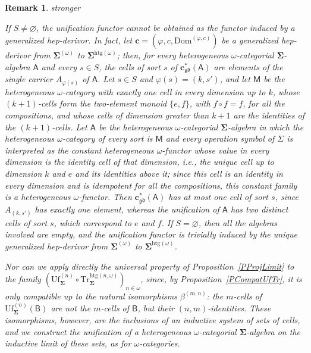 \documentclass[a4paper, reqno]{amsbook}
\makeatletter
\newcommand{\sig}[1]{\mathbf{#1}}             %
\newcommand{\calg}[1]{\boldsymbol{\mathsf{#1}}} %
\newcommand{\Dom}{\mathrm{Dom}}
\newcommand{\gd}{\mathfrak{gd}}              %
\newcommand{\htg}{\mathrm{htg}}                %
\newcommand{\Uf}{\mathrm{Uf}}
\newcommand{\Tr}{\mathrm{Tr}}
\theoremstyle{plain}
\newtheorem{remark}[theorem]{Remark}
\theoremstyle{definition}
\newcommand*{\CA@leanpending}{}
\newcommand*{\CA@leanrelation}{}
\newcommand*{\lean}[2]{%
  \ifcsname\string\color@lean@#1\endcsname\else
    \PackageError{main}{Unknown relation `#1' in \string\lean}{Use equivalent, weaker or stronger.}%
  \fi
  \gdef\CA@leanrelation{#1}%
  \gdef\CA@leanpending{#2}}
\makeatother
\begin{document}
\begin{remark}\label{RUfNotDerivorOmega}\lean{stronger}{Omega.unification_not_induced}
If $S\neq\varnothing$, the unification functor cannot be obtained as the functor induced by a generalized hep-derivor.
In fact, let $\mathbf{c}=(\varphi,c,\Dom^{(\varphi,c)})$ be a generalized hep-derivor from $\sig{\Sigma}^{(\omega)}$ to $\sig{\Sigma}^{\htg(\omega)}$; then, for every heterogeneous $\omega$-categorial $\sig{\Sigma}$-algebra $\calg{A}$ and every $s\in S$, the cells of sort $s$ of $\mathbf{c}^{\ast}_{\gd}(\calg{A})$ are elements of the single carrier $A_{\varphi(s)}$ of $\calg{A}$.
Let $s\in S$ and $\varphi(s)=(k,s')$, and let $\mathsf{M}$ be the heterogeneous $\omega$-category with exactly one cell in every dimension up to $k$, whose $(k+1)$-cells form the two-element monoid $\{e,f\}$, with $f\circ f=f$, for all the compositions, and whose cells of dimension greater than $k+1$ are the identities of the $(k+1)$-cells.
Let $\calg{A}$ be the heterogeneous $\omega$-categorial $\sig{\Sigma}$-algebra in which the heterogeneous $\omega$-category of every sort is $\mathsf{M}$ and every operation symbol of $\Sigma$ is interpreted as the constant heterogeneous $\omega$-functor whose value in every dimension is the identity cell of that dimension, i.e., the unique cell up to dimension $k$ and $e$ and its identities above it; since this cell is an identity in every dimension and is idempotent for all the compositions, this constant family is a heterogeneous $\omega$-functor.
Then $\mathbf{c}^{\ast}_{\gd}(\calg{A})$ has at most one cell of sort $s$, since $A_{(k,s')}$ has exactly one element, whereas the unification of $\calg{A}$ has two distinct cells of sort $s$, which correspond to $e$ and $f$.
If $S=\varnothing$, then all the algebras involved are empty, and the unification functor is trivially induced by the unique generalized hep-derivor from $\sig{\Sigma}^{(\omega)}$ to $\sig{\Sigma}^{\htg(\omega)}$.

Nor can we apply directly the universal property of Proposition~\ref{PProjLimit} to the family $(\Uf^{(n)}_{\sig{\Sigma}}\circ \Tr^{\htg(n,\omega)}_{\sig{\Sigma}})_{n\in\omega}$, since, by Proposition~\ref{PCompatUfTr}, it is only compatible up to the natural isomorphisms $\beta^{(m,n)}$: the $m$-cells of $\Uf^{(n)}_{\sig{\Sigma}}(\calg{B})$ are not the $m$-cells of $\calg{B}$, but their $(n,m)$-identities.
These isomorphisms, however, are the inclusions of an inductive system of sets of cells, and we construct the unification of a heterogeneous $\omega$-categorial $\sig{\Sigma}$-algebra on the inductive limit of these sets, as for $\omega$-categories.
\end{remark}
\end{document}
